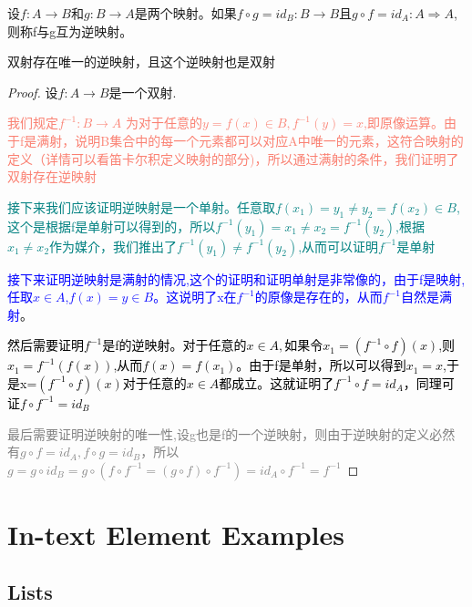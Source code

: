 \documentclass[
	11pt, %
	fleqn, %
	a4paper, %
]{LegrandOrangeBook}
\begin{document}
\begin{theorem}
	设$f:A\rightarrow B$和$g:B\rightarrow A$是两个映射。如果$f\circ g=id_B:B\rightarrow B$且$g\circ f=id_A:A\Rightarrow A$,则称f与g互为逆映射。
\end{theorem}


\begin{theorem}
	双射存在唯一的逆映射，且这个逆映射也是双射
\end{theorem}

\begin{proof}
	设$f:A\rightarrow B$是一个双射.

	\textcolor{Salmon}{我们规定$f^{-1}:B\rightarrow A$ 为对于任意的$y=f(x)\in B,f^{-1}(y)=x$,即原像运算。由于f是满射，说明B集合中的每一个元素都可以对应A中唯一的元素，这符合映射的定义（详情可以看笛卡尔积定义映射的部分)，所以通过满射的条件，我们证明了双射存在逆映射}

	\textcolor{teal}{接下来我们应该证明逆映射是一个单射。任意取$f(x_1)=y_1\not=y_2=f(x_2)\in B$,这个是根据f是单射可以得到的，所以$f^{-1}(y_1)=x_1\not=x_2=f^{-1}(y_2)$,根据$x_1\not=x_2$作为媒介，我们推出了$f^{-1}(y_1)\not=f^{-1}(y_2)$,从而可以证明$f^{-1}$是单射}

	\textcolor{blue}{接下来证明逆映射是满射的情况,这个的证明和证明单射是非常像的，由于f是映射,任取$x\in A$,$f(x)=y\in B$。这说明了x在$f^{-1}$的原像是存在的，从而$f^{-1}$自然是满射}。

	\textcolor{black}{然后需要证明$f^{-1}$是f的逆映射。对于任意的$x\in A,$如果令$x_1=(f^{-1}\circ f)(x)$,则$x_1=f^{-1}(f(x))$,从而$f(x)=f(x_1)$。由于f是单射，所以可以得到$x_1=x$,于是x=$(f^{-1}\circ f)(x)$对于任意的$x\in A$都成立。这就证明了$f^{-1}\circ f=id_A$，同理可证$f\circ f^{-1}=id_B$}

	\textcolor{gray}{最后需要证明逆映射的唯一性,设g也是f的一个逆映射，则由于逆映射的定义必然有$g\circ f=id_A,f\circ g=id_B$，所以$g=g\circ id_B=g\circ(f\circ f^{-1}=(g\circ f)\circ f^{-1})=id_A\circ f^{-1}=f^{-1}$}
\end{proof}
\chapter{In-text Element Examples}




\section{Lists}
\end{document}
